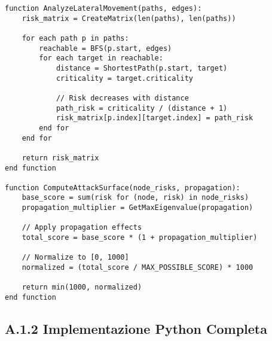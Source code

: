 \begin{verbatim}
function AnalyzeLateralMovement(paths, edges):
    risk_matrix = CreateMatrix(len(paths), len(paths))
    
    for each path p in paths:
        reachable = BFS(p.start, edges)
        for each target in reachable:
            distance = ShortestPath(p.start, target)
            criticality = target.criticality
            
            // Risk decreases with distance
            path_risk = criticality / (distance + 1)
            risk_matrix[p.index][target.index] = path_risk
        end for
    end for
    
    return risk_matrix
end function

function ComputeAttackSurface(node_risks, propagation):
    base_score = sum(risk for (node, risk) in node_risks)
    propagation_multiplier = GetMaxEigenvalue(propagation)
    
    // Apply propagation effects
    total_score = base_score * (1 + propagation_multiplier)
    
    // Normalize to [0, 1000]
    normalized = (total_score / MAX_POSSIBLE_SCORE) * 1000
    
    return min(1000, normalized)
end function
\end{verbatim}

\subsection{A.1.2 Implementazione Python Completa}

